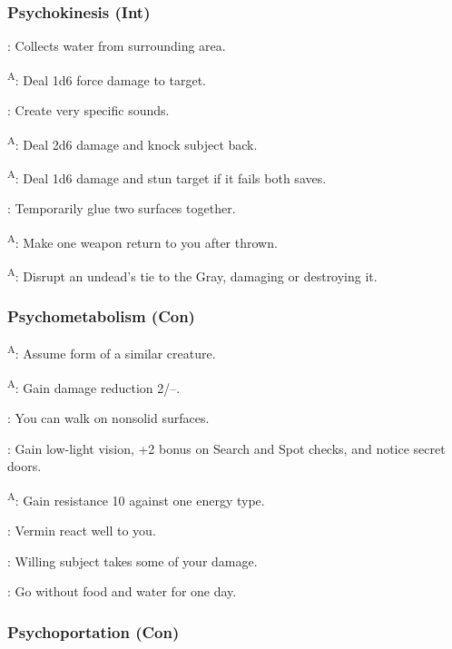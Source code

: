 \subsubsection{Psychokinesis (Int)}

: Collects water from surrounding area.

\textsuperscript{A}: Deal 1d6 force damage to target.

: Create very specific sounds.

\textsuperscript{A}: Deal 2d6 damage and knock subject back.

\textsuperscript{A}: Deal 1d6 damage and stun target if it fails both saves.

: Temporarily glue two surfaces together.

\textsuperscript{A}: Make one weapon return to you after thrown.

\textsuperscript{A}: Disrupt an undead's tie to the Gray, damaging or destroying it.


\subsubsection{Psychometabolism (Con)}

\textsuperscript{A}: Assume form of a similar creature.

\textsuperscript{A}: Gain damage reduction 2/--.

: You can walk on nonsolid surfaces.

: Gain low-light vision, +2 bonus on Search and Spot checks, and notice secret doors.

\textsuperscript{A}: Gain resistance 10 against one energy type.

: Vermin react well to you.

: Willing subject takes some of your damage.

: Go without food and water for one day.


\subsubsection{Psychoportation (Con)}


